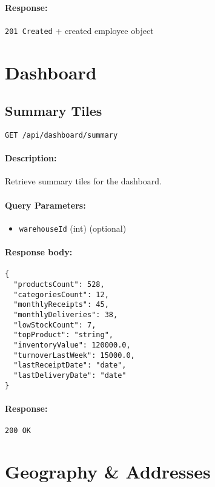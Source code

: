 \documentclass[a4paper,11pt]{article}
\begin{document}
\paragraph{Response:} \texttt{201 Created} + created employee object

\section{Dashboard}
\label{sec:dashboard}

\subsection{Summary Tiles}
\label{sec:dashboard-all}
\begin{verbatim}
GET /api/dashboard/summary
\end{verbatim}
\paragraph{Description:} Retrieve summary tiles for the dashboard.
\paragraph{Query Parameters:}
\begin{itemize}
  \item \texttt{warehouseId} (int) (optional)
\end{itemize}
\paragraph{Response body:}
\begin{verbatim}
{
  "productsCount": 528,
  "categoriesCount": 12,
  "monthlyReceipts": 45,
  "monthlyDeliveries": 38,
  "lowStockCount": 7,
  "topProduct": "string",
  "inventoryValue": 120000.0,
  "turnoverLastWeek": 15000.0,
  "lastReceiptDate": "date",
  "lastDeliveryDate": "date"
}
\end{verbatim}
\paragraph{Response:} \texttt{200 OK}

\section{Geography \& Addresses}
\label{sec:geography}
\end{document}
